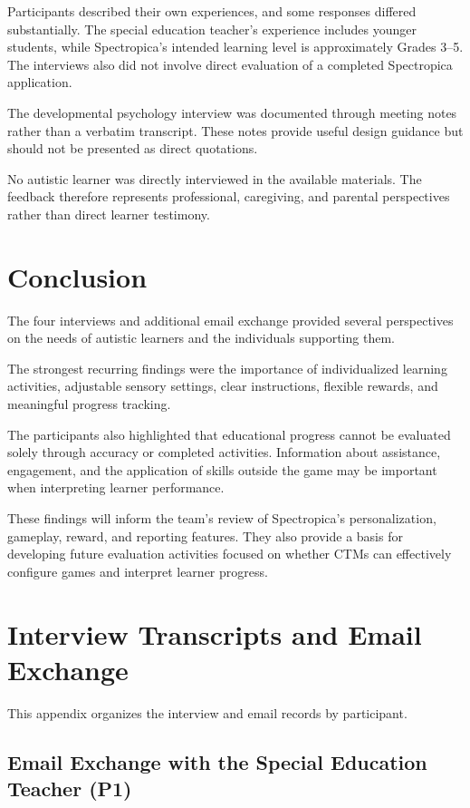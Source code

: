 \documentclass[12pt, titlepage]{article}
\begin{document}
Participants described their own experiences, and some responses differed substantially. The special education teacher's experience includes younger students, while Spectropica's intended learning level is approximately Grades 3--5. The interviews also did not involve direct evaluation of a completed Spectropica application.

The developmental psychology interview was documented through meeting notes rather than a verbatim transcript. These notes provide useful design guidance but should not be presented as direct quotations.

No autistic learner was directly interviewed in the available materials. The feedback therefore represents professional, caregiving, and parental perspectives rather than direct learner testimony.

\section{Conclusion}

The four interviews and additional email exchange provided several perspectives on the needs of autistic learners and the individuals supporting them.

The strongest recurring findings were the importance of individualized learning activities, adjustable sensory settings, clear instructions, flexible rewards, and meaningful progress tracking.

The participants also highlighted that educational progress cannot be evaluated solely through accuracy or completed activities. Information about assistance, engagement, and the application of skills outside the game may be important when interpreting learner performance.

These findings will inform the team's review of Spectropica's personalization, gameplay, reward, and reporting features. They also provide a basis for developing future evaluation activities focused on whether CTMs can effectively configure games and interpret learner progress.

\appendix
\section{Interview Transcripts and Email Exchange}
\label{app:interview-responses}

This appendix organizes the interview and email records by participant.

\subsection{Email Exchange with the Special Education Teacher (P1)}
\label{app:participant-1}
\end{document}
